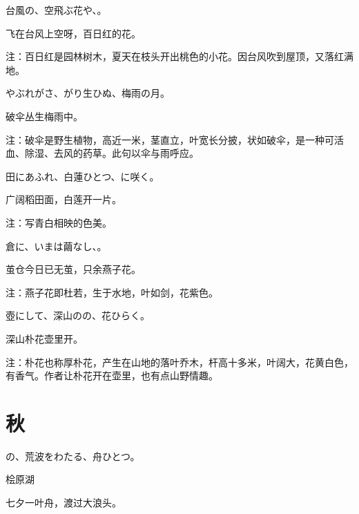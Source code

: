 \begin{haiku}
    {\FH 台風の、空飛ぶ花や、。}

    {\FK 飞在台风上空呀，百日红的花。}

    {\FT 注：百日红是园林树木，夏天在枝头开出桃色的小花。因台风吹到屋顶，又落红满地。}
\end{haiku}

\begin{haiku}
    {\FH やぶれがさ、がり生ひぬ、梅雨の月。}

    {\FK 破伞丛生梅雨中。}

    {\FT 注：破伞是野生植物，高近一米，茎直立，叶宽长分披，状如破伞，是一种可活血、除湿、去风的药草。此句以伞与雨呼应。}
\end{haiku}

\begin{haiku}
    {\FH 田にあふれ、白蓮ひとつ、に咲く。}

    {\FK 广阔稻田面，白莲开一片。}

    {\FT 注：写青白相映的色美。}
\end{haiku}

\begin{haiku}
    {\FH {}倉に、いまは繭なし、。}

    {\FK 茧仓今日已无茧，只余燕子花。}

    {\FT 注：燕子花即杜若，生于水地，叶如剑，花紫色。}
\end{haiku}

\begin{haiku}
    {\FH 壺にして、深山のの、花ひらく。}

    {\FK 深山朴花壶里开。}

    {\FT 注：朴花也称厚朴花，产生在山地的落叶乔木，杆高十多米，叶阔大，花黄白色，有香气。作者让朴花开在壶里，也有点山野情趣。}
\end{haiku}

\section{\FK 秋}

\setcounter{haikucounter}{0}

\begin{haiku}
    {\FH {}の、荒波をわたる、舟ひとつ。}

    {\FK 桧原湖}

    {\FK 七夕一叶舟，渡过大浪头。}
\end{haiku}

